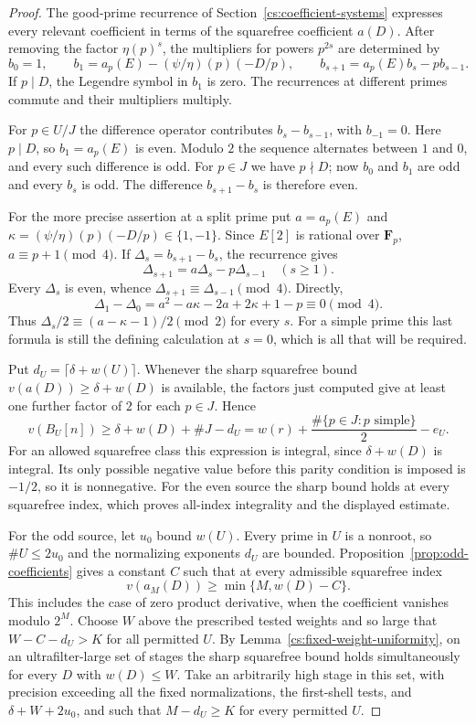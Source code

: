 \begin{proof}
The good-prime recurrence of Section~\ref{cs:coefficient-systems} expresses
every relevant coefficient in terms of the squarefree coefficient $a(D)$.
After removing the factor $\eta(p)^s$, the multipliers for powers $p^{2s}$
are determined by
\[
 b_0=1,\qquad
 b_1=a_p(E)-(\psi/\eta)(p)(-D/p),\qquad
 b_{s+1}=a_p(E)b_s-pb_{s-1}.
\]
If $p\mid D$, the Legendre symbol in $b_1$ is zero.  The recurrences at
different primes commute and their multipliers multiply.

For $p\in U/J$ the difference operator contributes
$b_s-b_{s-1}$, with $b_{-1}=0$.  Here $p\mid D$, so $b_1=a_p(E)$ is
even.  Modulo $2$ the sequence alternates between $1$ and $0$, and every
such difference is odd.  For $p\in J$ we have $p\nmid D$; now $b_0$
and $b_1$ are odd and every $b_s$ is odd.  The difference
$b_{s+1}-b_s$ is therefore even.

For the more precise assertion at a split prime put
$a=a_p(E)$ and $\kappa=(\psi/\eta)(p)(-D/p)\in\{1,-1\}$.
Since $E[2]$ is rational over $\mathbf F_p$,
$a\equiv p+1\pmod4$.  If $\Delta_s=b_{s+1}-b_s$, the recurrence gives
\[
 \Delta_{s+1}=a\Delta_s-p\Delta_{s-1}\quad(s\geq1).
\]
Every $\Delta_s$ is even, whence
$\Delta_{s+1}\equiv\Delta_{s-1}\pmod4$.  Directly,
\[
 \Delta_1-\Delta_0
 =a^2-a\kappa-2a+2\kappa+1-p\equiv0\pmod4.
\]
Thus $\Delta_s/2\equiv(a-\kappa-1)/2\pmod2$ for every $s$.
For a simple prime this last formula is still the defining calculation
at $s=0$, which is all that will be required.

Put $d_U=\lceil\delta+w(U)\rceil$. Whenever the sharp squarefree
bound $v(a(D))\ge\delta+w(D)$ is available, the factors just computed
give at least one further factor of $2$ for each $p\in J$. Hence
\[
 v(B_U[n])\ge \delta+w(D)+\#J-d_U
 =w(r)+\frac{\#\{p\in J:p\text{ simple}\}}2-e_U.
\]
For an allowed squarefree class this expression is integral, since
$\delta+w(D)$ is integral. Its only possible negative value before
this parity condition is imposed is $-1/2$, so it is nonnegative.
For the even source the sharp bound holds at every squarefree index,
which proves all-index integrality and the displayed estimate.

For the odd source, let $u_0$ bound $w(U)$. Every prime in $U$ is a
nonroot, so $\#U\le2u_0$ and the normalizing exponents $d_U$ are
bounded. Proposition~\ref{prop:odd-coefficients} gives a constant
$C$ such that at every admissible squarefree index
\[
                   v(a_M(D))\ge\min\{M,w(D)-C\}.
\]
This includes the case of zero product derivative, when the coefficient
vanishes modulo $2^M$. Choose $W$ above the prescribed tested weights
and so large that $W-C-d_U>K$ for all permitted $U$. By
Lemma~\ref{cs:fixed-weight-uniformity}, on an ultrafilter-large set
of stages the sharp squarefree bound holds simultaneously for every
$D$ with $w(D)\le W$. Take an arbitrarily high stage in this set,
with precision exceeding all the fixed normalizations, the first-shell
tests, and $\delta+W+2u_0$, and such that $M-d_U\ge K$
for every permitted $U$.


\end{proof}
